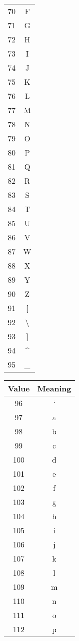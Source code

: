 \documentclass[12pt]{book}
\begin{document}
{\begin{tabular}{c c}
     70 & F \\
     71 & G \\
     72 & H \\
     73 & I \\
     74 & J \\
     75 & K \\
     76 & L \\
     77 & M \\
     78 & N \\
     79 & O \\
     80 & P \\
     81 & Q \\
     82 & R \\
     83 & S \\
     84 & T \\
     85 & U \\
     86 & V \\
     87 & W \\
     88 & X \\
     89 & Y \\
     90 & Z \\
     91 & [ \\
     92 & \textbackslash \\
     93 & ] \\
     94 & \textasciicircum \\
     95 & \_ \\
  \end{tabular}
  \quad
  \begin{tabular}{c c}
    \hline
    Value & Meaning \\
    \hline
     96 & ` \\
     97 & a \\
     98 & b \\
     99 & c \\
    100 & d \\
    101 & e \\
    102 & f \\
    103 & g \\
    104 & h \\
    105 & i \\
    106 & j \\
    107 & k \\
    108 & l \\
    109 & m \\
    110 & n \\
    111 & o \\
    112 & p \\

\end{tabular}}
\end{document}
